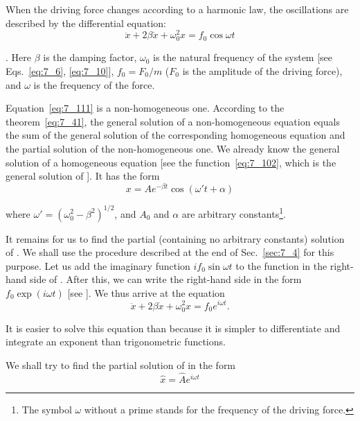 When the driving force changes according to a harmonic law, the oscillations are described by the differential equation:
\begin{equation}\label{eq:7_111}
	\ddot{x} + 2\beta\dot{x} + \omega_0^2 x = f_0\cos\omega t
\end{equation}

. Here $\beta$ is the damping factor, $\omega_0$ is the natural frequency of the system [see Eqs.~\eqref{eq:7_6}, \eqref{eq:7_10}], $f_0=F_0/m$ ($F_0$ is the amplitude of the driving force), and $\omega$ is the frequency of the force.

Equation~\eqref{eq:7_111} is a non-homogeneous one. According to the theorem~\eqref{eq:7_41}, the general solution of a non-homogeneous equation equals the sum of the general solution of the corresponding homogeneous equation and the partial solution of the non-homogeneous one. We already know the general solution of a homogeneous equation [see the function~\eqref{eq:7_102}, which is the general solution of ]. It has the form
\begin{equation}\label{eq:7_112}
	x = A e^{-\beta t} \cos(\omega' t + \alpha)
\end{equation}

\noindent
where $\omega'=\left(\omega_0^2 - \beta^2\right)^{1/2}$, and $A_0$ and $\alpha$ are arbitrary constants\footnote{The symbol $\omega$ without a prime stands for the frequency of the driving force.}.

It remains for us to find the partial (containing no arbitrary constants) solution of . We shall use the procedure described at the end of Sec.~\ref{sec:7_4} for this purpose. Let us add the imaginary function $if_0\sin\omega t$ to the function in the right-hand side of . After this, we can write the right-hand side in the form $f_0\exp(i\omega t)$ [see ]. We thus arrive at the equation
\begin{equation}\label{eq:7_113}
	\ddot{x} + 2\beta\dot{x} + \omega_0^2 x = f_0 e^{i\omega t}.
\end{equation}

\noindent
It is easier to solve this equation than  because it is simpler to differentiate and integrate an exponent than trigonometric functions.

We shall try to find the partial solution of  in the form
\begin{equation}\label{eq:7_114}
	\hat{x} = \hat{A} e^{i\omega t}
\end{equation}

